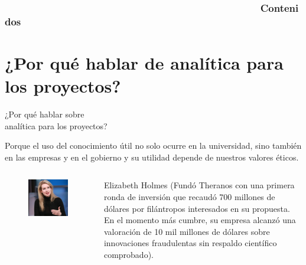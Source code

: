 \documentclass[aspectratio=169]{beamer}
\begin{document}

\begin{frame}
\frametitle{~~~~~~~~~~~~~~~~~~~~~~~~~~~~~~~~~~~~~~~~~~~~~~~~~~~~~~~~~~~~~~~~~~~~~~~~~~~~~~~~~~~~~~~~~~~~~~~~~~~Contenidos} 
\tableofcontents
\end{frame}


\section{¿Por qué hablar de analítica para los proyectos?}
\begin{frame}
\initclock
\centering
\Huge
¿Por qué hablar sobre\\
analítica para los proyectos?\\
\vspace{2cm}
\end{frame}

\begin{frame}
\huge{Porque el uso del conocimiento útil no solo ocurre en la universidad, sino también en las empresas y en el gobierno y su utilidad depende de nuestros valores éticos.}    
\end{frame}

\begin{frame}
\begin{columns}
\begin{column}{0.5\textwidth}
\begin{figure}
\includegraphics[width=.6\textwidth]{Holmes.png}
\end{figure}   
\end{column}
\begin{column}{0.5\textwidth}
Elizabeth Holmes (Fundó Theranos con una primera ronda de inversión que recaudó 700 millones de dólares por filántropos interesados en su propuesta. En el momento más cumbre, su empresa alcanzó una valoración de 10 mil millones de dólares sobre innovaciones fraudulentas sin respaldo científico comprobado).\\

\end{column}
\end{columns}
\end{frame}
\end{document}
